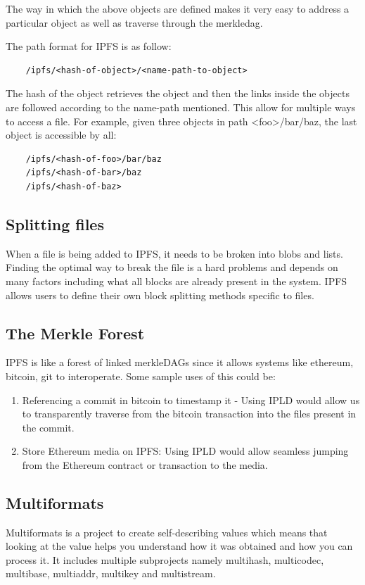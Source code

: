 The way in which the above objects are defined makes it very easy to address a particular object as well as traverse through the merkledag.

The path format for IPFS is as follow:
\begin{verbatim}
    /ipfs/<hash-of-object>/<name-path-to-object>
\end{verbatim}
The hash of the object retrieves the object and then the links inside the objects are followed according to the name-path mentioned. This allow for multiple ways to access a file. For example, given three objects in path
<foo>/bar/baz, the last object is accessible by all:

\begin{verbatim}
    /ipfs/<hash-of-foo>/bar/baz
    /ipfs/<hash-of-bar>/baz
    /ipfs/<hash-of-baz>
\end{verbatim}

\subsection{Splitting files}
When a file is being added to IPFS, it needs to be broken into blobs and lists. Finding the optimal way to break the file is a hard problems and depends on many factors including what all blocks are already present in the system. IPFS allows users to define their own block splitting methods specific to files.

\subsection{The Merkle Forest}
IPFS is like a forest of linked merkleDAGs since it allows systems like ethereum, bitcoin, git to interoperate. Some sample uses of this could be:

\begin{enumerate}
    \item Referencing a commit in bitcoin to timestamp it - Using IPLD would allow us to transparently traverse from the bitcoin transaction into the files present in the commit.
    \item Store Ethereum media on IPFS: Using IPLD would allow seamless jumping from the Ethereum contract or transaction to the media.
\end{enumerate}


\subsection{Multiformats}
Multiformats is a project to create self-describing values which means that looking at the value helps you understand how it was obtained and how you can process it. It includes multiple subprojects namely multihash, multicodec, multibase, multiaddr, multikey and multistream.

